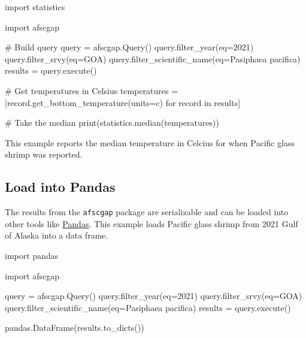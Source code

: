 \documentclass[
  letterpaper,
  oneside,
  open=any]{scrbook}
\newenvironment{Shaded}{\begin{snugshade}}{\end{snugshade}}
\newcommand{\AttributeTok}[1]{\textcolor[rgb]{0.40,0.45,0.13}{#1}}
\newcommand{\CommentTok}[1]{\textcolor[rgb]{0.37,0.37,0.37}{#1}}
\newcommand{\ControlFlowTok}[1]{\textcolor[rgb]{0.00,0.23,0.31}{#1}}
\newcommand{\DecValTok}[1]{\textcolor[rgb]{0.68,0.00,0.00}{#1}}
\newcommand{\FunctionTok}[1]{\textcolor[rgb]{0.28,0.35,0.67}{#1}}
\newcommand{\NormalTok}[1]{\textcolor[rgb]{0.00,0.23,0.31}{#1}}
\newcommand{\OtherTok}[1]{\textcolor[rgb]{0.00,0.23,0.31}{#1}}
\newcommand{\StringTok}[1]{\textcolor[rgb]{0.13,0.47,0.30}{#1}}
\begin{document}
\begin{Shaded}
\begin{Highlighting}[]
\NormalTok{import statistics}

\NormalTok{import afscgap}

\CommentTok{\# Build query}
\NormalTok{query }\OtherTok{=} \FunctionTok{afscgap.Query}\NormalTok{()}
\FunctionTok{query.filter\_year}\NormalTok{(}\AttributeTok{eq=}\DecValTok{2021}\NormalTok{)}
\FunctionTok{query.filter\_srvy}\NormalTok{(}\AttributeTok{eq=}\StringTok{\textquotesingle{}GOA\textquotesingle{}}\NormalTok{)}
\FunctionTok{query.filter\_scientific\_name}\NormalTok{(}\AttributeTok{eq=}\StringTok{\textquotesingle{}Pasiphaea pacifica\textquotesingle{}}\NormalTok{)}
\NormalTok{results }\OtherTok{=} \FunctionTok{query.execute}\NormalTok{()}

\CommentTok{\# Get temperatures in Celsius}
\NormalTok{temperatures }\OtherTok{=}\NormalTok{ [}\FunctionTok{record.get\_bottom\_temperature}\NormalTok{(}\AttributeTok{units=}\StringTok{\textquotesingle{}c\textquotesingle{}}\NormalTok{) }\ControlFlowTok{for}\NormalTok{ record }\ControlFlowTok{in}\NormalTok{ results]}

\CommentTok{\# Take the median}
\FunctionTok{print}\NormalTok{(}\FunctionTok{statistics.median}\NormalTok{(temperatures))}
\end{Highlighting}
\end{Shaded}

This example reports the median temperature in Celcius for when Pacific
glass shrimp was reported.

\hypertarget{load-into-pandas}{%
\subsection{Load into Pandas}\label{load-into-pandas}}

The results from the \texttt{afscgap} package are serializable and can
be loaded into other tools like
\href{https://pandas.pydata.org/}{Pandas}. This example loads Pacific
glass shrimp from 2021 Gulf of Alaska into a data frame.

\begin{Shaded}
\begin{Highlighting}[]
\NormalTok{import pandas}

\NormalTok{import afscgap}

\NormalTok{query }\OtherTok{=} \FunctionTok{afscgap.Query}\NormalTok{()}
\FunctionTok{query.filter\_year}\NormalTok{(}\AttributeTok{eq=}\DecValTok{2021}\NormalTok{)}
\FunctionTok{query.filter\_srvy}\NormalTok{(}\AttributeTok{eq=}\StringTok{\textquotesingle{}GOA\textquotesingle{}}\NormalTok{)}
\FunctionTok{query.filter\_scientific\_name}\NormalTok{(}\AttributeTok{eq=}\StringTok{\textquotesingle{}Pasiphaea pacifica\textquotesingle{}}\NormalTok{)}
\NormalTok{results }\OtherTok{=} \FunctionTok{query.execute}\NormalTok{()}

\FunctionTok{pandas.DataFrame}\NormalTok{(}\FunctionTok{results.to\_dicts}\NormalTok{())}
\end{Highlighting}
\end{Shaded}
\end{document}
